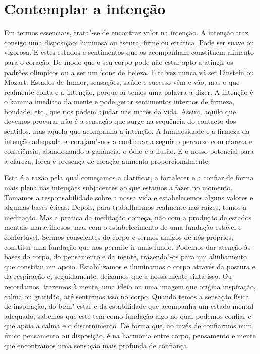 \section{Contemplar a intenção}

Em termos essenciais, trata"-se de encontrar valor na intenção. A intenção traz
consigo uma disposição: luminosa ou escura, firme ou errática. Pode ser suave ou
vigorosa. E estes estados e sentimentos que os acompanham constituem alimento
para o coração. De modo que o seu corpo pode não estar apto a atingir os padrões
olímpicos ou a ser um ícone de beleza. E talvez nunca vá ser Einstein ou Mozart.
Estados de humor, sensações, saúde e sucesso vêm e vão, mas o que realmente
conta é a intenção, porque aí temos uma palavra a dizer. A intenção é o kamma
imediato da mente e pode gerar sentimentos internos de firmeza, bondade, etc.,
que nos podem ajudar nas marés da vida. Assim, aquilo que devemos procurar não é
a sensação que surge na sequência do contacto dos sentidos, mas aquela que
acompanha a intenção. A luminosidade e a firmeza da intenção adequada
encorajam"-nos a continuar a seguir o percurso com clareza e consciência,
abandonando a ganância, o ódio e a ilusão. E o nosso potencial para a clareza,
força e presença de coração aumenta proporcionalmente.

Esta é a razão pela qual começamos a clarificar, a fortalecer e a confiar de
forma mais plena nas intenções subjacentes ao que estamos a fazer no momento.
Tomamos a responsabilidade sobre a nossa vida e estabelecemos alguns valores e
algumas bases éticas. Depois, para trabalharmos realmente nas raízes, temos a
meditação. Mas a prática da meditação começa, não com a produção de estados
mentais maravilhosos, mas com o estabelecimento de uma fundação estável e
confortável. Sermos conscientes do corpo e sermos amigos de nós próprios,
constituí uma fundação que nos permite ir mais fundo. Podemos dar atenção às
bases do corpo, do pensamento e da mente, trazendo"-os para um alinhamento que
constitui um apoio. Estabilizamos e iluminamos o corpo através da postura e da
respiração e, seguidamente, deixamos que a nossa mente sinta isso. Ou
recordamos, trazemos à mente, uma ideia ou uma imagem que origina inspiração,
calma ou gratidão, até sentirmos isso no corpo. Quando temos a sensação física
de inspiração, do bem"-estar e da estabilidade que acompanha um estado mental
adequado, sabemos que este tem como fundação algo no qual podemos confiar e que
apoia a calma e o discernimento. De forma que, ao invés de confiarmos num único
pensamento ou disposição, é na harmonia entre corpo, pensamento e mente que
encontramos uma sensação mais profunda de confiança.

